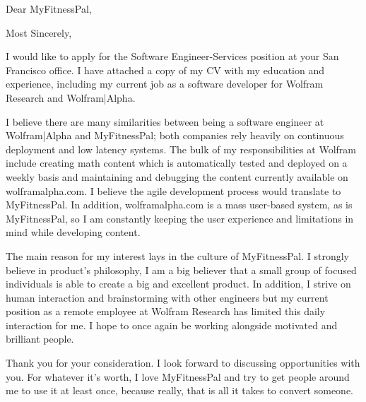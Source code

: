 \documentclass[11pt,a4paper,unicode]{moderncv}
\begin{document}
\vspace*{-6mm}

\vspace*{-6mm}



\date{\today} %


\opening{{Dear MyFitnessPal},} %
\closing{Most Sincerely,} %

\makelettertitle %
	I would like to apply for the Software Engineer-Services position at your San Francisco office. I have attached a copy of my CV with my education and experience, including my current job as a software developer for Wolfram Research and Wolfram|Alpha. 
			
\vspace{3mm}  
	I believe there are many similarities between being a software engineer at Wolfram|Alpha and MyFitnessPal; both companies rely heavily on continuous deployment and low latency systems. The bulk of my responsibilities at Wolfram include creating math content which is automatically tested and deployed on a weekly basis and maintaining and debugging the content currently available on wolframalpha.com. I believe the agile development process would translate to MyFitnessPal. In addition, wolframalpha.com is a mass user-based system, as is MyFitnessPal, so I am constantly keeping the user experience and limitations in mind while developing content. 
	
\vspace{3mm}  
	The main reason for my interest lays in the culture of MyFitnessPal. I strongly believe in product's philosophy, I am a big believer that a small group of focused individuals is able to create a big and excellent product. In addition, I strive on human interaction and brainstorming with other engineers but my current position as a remote employee at Wolfram Research has limited this daily interaction for me. I hope to once again be working alongside motivated and brilliant people. 
	
\vspace{3mm}  
	Thank you for your consideration. I look forward to discussing opportunities with you. For whatever it's worth, I love MyFitnessPal and try to get people around me to use it at least once, because really, that is all it takes to convert someone. 

\makeletterclosing %
\end{document}
